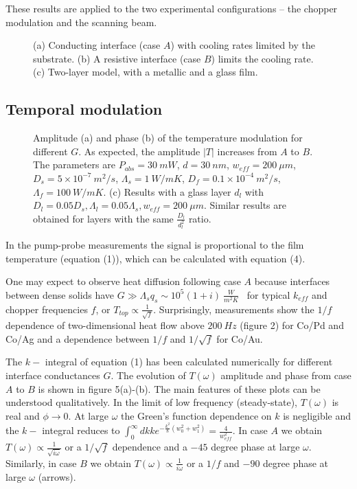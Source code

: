 \documentclass[5p]{elsarticle}
\begin{document}
These results are applied to the two experimental configurations  -- the chopper modulation and the scanning beam.

\begin{figure}
\centering{}
\caption{\label{fig:Figure1} (a) Conducting interface (case $A$) with cooling rates limited by the substrate. (b) A resistive interface (case $B$) limits the cooling rate. (c) Two-layer model, with a metallic and a glass film.}
\end{figure}

\subsection{Temporal modulation}

\begin{figure}
\centering{}
\caption{\label{fig:Figure1} Amplitude (a) and phase (b) of the temperature modulation for different $G$. As expected, the amplitude $|T|$ increases from $A$ to $B$. The parameters are $P_{abs}=30~mW$, $d = 30~nm$, $w_{eff} = 200~\mu m$, $D_{s} = 5 \times10^{-7}~m^{2}/s$, $\Lambda_{s} = 1~W/mK$, $D_{f} = 0.1\times10^{-4}~m^{2}/s$, $\Lambda_{f} = 100~W/mK$. (c) Results with a glass layer $d_{l}$ with $D_{l}=0.05D_{s}, \Lambda_{l}=0.05\Lambda_{s},w_{eff}=200~\mu m$. Similar results are obtained for layers with the same $\frac{D_{l}}{d_{l}^{2}}$ ratio.}
\end{figure}

In the pump-probe measurements the signal is proportional to the film temperature (equation (1)), which can be calculated with equation (4).

One may expect to observe heat diffusion following case $A$ because interfaces between dense solids have $G \gg \Lambda_{s}q_{s} \sim 10^{5}(1+i)~\frac{W}{m^{2}K}$~\cite{2014Cahill} for typical $k_{eff}$ and chopper frequencies $f$, or $T_{top}\propto \frac{1}{\sqrt{f}}$. Surprisingly, measurements show the $1/f$ dependence of two-dimensional heat flow above $200~Hz$ (figure 2) for Co/Pd and Co/Ag and a dependence between $1/f$ and $1/\sqrt{f}$ for Co/Au.

The $k-$ integral of equation (1) has been calculated numerically for different interface conductances $G$. The evolution of $T(\omega)$ amplitude and phase from case $A$ to $B$ is shown in figure 5(a)-(b). The main features of these plots can be understood qualitatively. In the limit of low frequency (steady-state), $T(\omega)$ is real and $\phi \rightarrow 0$. At large $\omega$ the Green's function dependence on $k$ is negligible and the $k-$ integral reduces to $\int_{0} ^{\infty} dk k e^{-\frac{k^{2}}{8}(w_{0}^{2}+w_{1}^{2})} =\frac{4}{w_{eff}^{2}}$. In case $A$ we obtain $T(\omega) \propto \frac{1}{\sqrt{i\omega}}$ or a $1/\sqrt{f}$ dependence and a $-45$ degree phase at large $\omega$. Similarly, in case $B$ we obtain $T(\omega) \propto \frac{1}{i\omega}$ or a $1/f$ and $-90$ degree phase at large $\omega$ (arrows).
\end{document}
